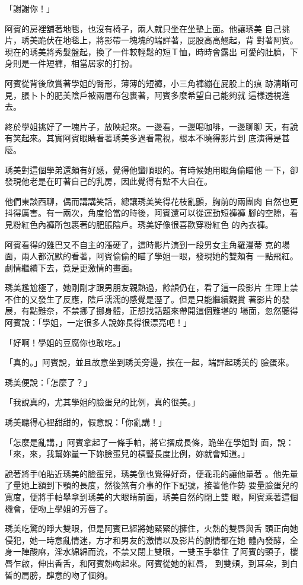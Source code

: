 「謝謝你！」

阿賓的房裡舖著地毯，也沒有椅子，兩人就只坐在坐墊上面。他讓琇美
自己挑片，琇美跪伏在地毯上，將影帶一塊塊的端詳著，屁股高高翹起，背
對著阿賓。現在的琇美將秀髮盤起，換了一件較輕鬆的短Ｔ恤，時時會露出
可愛的肚臍，下身則是一件短褲，相當居家的打扮。

阿賓從背後欣賞著學姐的臀形，薄薄的短褲，小三角褲繃在屁股上的痕
跡清晰可見，脹卜卜的肥美陰戶被兩層布包裹著，阿賓多麼希望自己能夠就
這樣透視進去。

終於學姐挑好了一塊片子，放映起來。一邊看，一邊喝咖啡，一邊聊聊
天，有說有笑起來。其實阿賓眼睛看著琇美多過看電視，根本不曉得影片到
底演得是甚麼。

琇美對這個學弟還頗有好感，覺得他蠻順眼的。有時候她用眼角偷瞄他
一下，卻發現他老是在盯著自己的乳房，因此覺得有點不大自在。

他們東談西聊，偶而講講笑話，總讓琇美笑得花枝亂顫，胸前的兩團肉
自然也更抖得厲害。有一兩次，角度恰當的時後，阿賓還可以從運動短褲褲
腳的空隙，看見粉紅色內褲所包裹著的肥脹陰戶。琇美好像很喜歡穿粉紅色
的內衣褲。

阿賓看得的雞巴又不自主的漲硬了，這時影片演到一段男女主角羅漫蒂
克的場面，兩人都沉默的看著，阿賓偷偷的瞄了學姐一眼，發現她的雙頰有
一點飛紅。劇情繼續下去，竟是更激情的畫面。

琇美尷尬極了，她剛剛才跟男朋友親熱過，餘韻仍在，看了這一段影片
生理上禁不住的又發生了反應，陰戶濡濡的感覺是溼了。但是只能繼續觀賞
著影片的發展，有點難奈，不禁挪了挪身體，正想找話題來帶開這個難堪的
場面，忽然聽得阿賓說：「學姐，一定很多人說妳長得很漂亮吧！」

「好啊！學姐的豆腐你也敢吃。」

「真的。」阿賓說，並且故意坐到琇美旁邊，挨在一起，端詳起琇美的
臉蛋來。

琇美便說：「怎麼了？」

「我說真的，尤其學姐的臉蛋兒的比例，真的很美。」

琇美聽得心裡甜甜的，假意說：「你亂講！」

「怎麼是亂講，」阿賓拿起了一條手帕，將它摺成長條，跪坐在學姐對
面，說：「來，來，我幫妳量一下妳臉蛋兒的橫豎長度比例，妳就會知道。」

說著將手帕貼近琇美的臉蛋兒，琇美倒也覺得好奇，便乖乖的讓他量著
。他先量了量她上額到下顎的長度，然後煞有介事的作下記號，接著他作勢
要量臉蛋兒的寬度，便將手帕舉拿到琇美的大眼睛前面，琇美自然的閉上雙
眼，阿賓乘著這個機會，便吻上學姐的芳唇了。

琇美吃驚的睜大雙眼，但是阿賓已經將她緊緊的擁住，火熱的雙唇與舌
頭正向她侵犯，她一時意亂情迷，方才和男友的激情以及影片的劇情都在她
體內發酵，全身一陣酸麻，淫水綿綿而流，不禁又閉上雙眼，一雙玉手攀住
了阿賓的頸子，櫻唇乍啟，伸出香舌，和阿賓熱吻起來。阿賓從她的紅唇，
到雙頰，到耳朵，到白皙的肩膀，肆意的吻了個夠。

